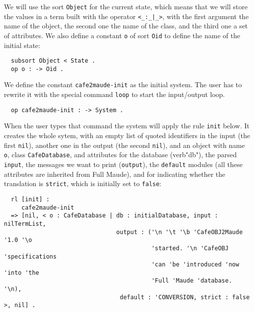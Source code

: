 We will use the sort \verb"Object" for the current state, which means that we will
store the values in a term built with the operator \verb"<_:_|_>", with the first
argument the name of the object, the second one the name of the class, and the third
one a set of attributes.
%
We also define a constant \verb"o" of sort \verb"Oid" to define the name of the initial
state:

{\codesize
\begin{verbatim}
  subsort Object < State .
  op o : -> Oid .
\end{verbatim}
}
{\codesize
\begin{comment}
  var  H : Header .
  var  O : Oid .
  var  X@Database : CafeDatabaseClass .
  vars Q Q' QI : Qid .
  vars QIL QIL' QIL'' : QidList .
  var  TL : TermList .
  var  DB : Database .
  var  Atts : AttributeSet .
  var  S : State .
\end{comment}
}

We define the constant \verb"cafe2maude-init" as the initial system. The user has to
rewrite it with the special command \verb"loop" to start the input/output loop.


{\codesize
\begin{verbatim}
  op cafe2maude-init : -> System .
\end{verbatim}
}

When the user types that command the system will apply the rule \verb"init" below.
It creates the whole sytem, with an empty list of quoted identifiers in the input
(the first \verb"nil"), another one in the output (the second \verb"nil"), and an
object with name \verb"o", class \verb"CafeDatabase", and attributes for the database
(verb"db"), the parsed \verb"input", the messages we want to print (\verb"output"),
the \verb"default" modules (all these attributes are inherited from Full Maude),
and for indicating whether the translation is \verb"strict", which is initially
set to \verb"false":

{\codesize
\begin{verbatim}
  rl [init] :
     cafe2maude-init
  => [nil, < o : CafeDatabase | db : initialDatabase, input : nilTermList,
                                output : ('\n '\t '\b 'CafeOBJ2Maude '1.0 '\o
                                          'started. '\n 'CafeOBJ 'specifications
                                          'can 'be 'introduced 'now 'into 'the
                                          'Full 'Maude 'database. '\n),
                                 default : 'CONVERSION, strict : false >, nil] .
\end{verbatim}
}

